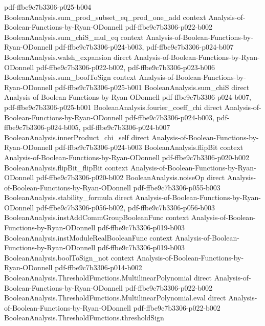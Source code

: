 \begin{lemma}
  {pdf-ffbe9c7b3306-p025-b004}
\proofstep
  {BooleanAnalysis.sum_prod_subset_eq_prod_one_add}
  {context}
  {Analysis-of-Boolean-Functions-by-Ryan-ODonnell}
  {pdf-ffbe9c7b3306-p022-b002}
\proofstep
  {BooleanAnalysis.sum_chiS_mul_eq}
  {context}
  {Analysis-of-Boolean-Functions-by-Ryan-ODonnell}
  {pdf-ffbe9c7b3306-p024-b003,
    pdf-ffbe9c7b3306-p024-b007}
\proofstep
  {BooleanAnalysis.walsh_expansion}
  {direct}
  {Analysis-of-Boolean-Functions-by-Ryan-ODonnell}
  {pdf-ffbe9c7b3306-p022-b002,
    pdf-ffbe9c7b3306-p023-b006}
\proofstep
  {BooleanAnalysis.sum_boolToSign}
  {context}
  {Analysis-of-Boolean-Functions-by-Ryan-ODonnell}
  {pdf-ffbe9c7b3306-p025-b001}
\proofstep
  {BooleanAnalysis.sum_chiS}
  {direct}
  {Analysis-of-Boolean-Functions-by-Ryan-ODonnell}
  {pdf-ffbe9c7b3306-p024-b007,
    pdf-ffbe9c7b3306-p025-b001}
\proofstep
  {BooleanAnalysis.fourier_coeff_chi}
  {direct}
  {Analysis-of-Boolean-Functions-by-Ryan-ODonnell}
  {pdf-ffbe9c7b3306-p024-b003,
    pdf-ffbe9c7b3306-p024-b005,
    pdf-ffbe9c7b3306-p024-b007}
\proofstep
  {BooleanAnalysis.innerProduct_chi_self}
  {direct}
  {Analysis-of-Boolean-Functions-by-Ryan-ODonnell}
  {pdf-ffbe9c7b3306-p024-b003}
\proofstep
  {BooleanAnalysis.flipBit}
  {context}
  {Analysis-of-Boolean-Functions-by-Ryan-ODonnell}
  {pdf-ffbe9c7b3306-p020-b002}
\proofstep
  {BooleanAnalysis.flipBit_flipBit}
  {context}
  {Analysis-of-Boolean-Functions-by-Ryan-ODonnell}
  {pdf-ffbe9c7b3306-p020-b002}
\proofstep
  {BooleanAnalysis.noiseOp}
  {direct}
  {Analysis-of-Boolean-Functions-by-Ryan-ODonnell}
  {pdf-ffbe9c7b3306-p055-b003}
\proofstep
  {BooleanAnalysis.stability_formula}
  {direct}
  {Analysis-of-Boolean-Functions-by-Ryan-ODonnell}
  {pdf-ffbe9c7b3306-p056-b002,
    pdf-ffbe9c7b3306-p056-b003}
\proofstep
  {BooleanAnalysis.instAddCommGroupBooleanFunc}
  {context}
  {Analysis-of-Boolean-Functions-by-Ryan-ODonnell}
  {pdf-ffbe9c7b3306-p019-b003}
\proofstep
  {BooleanAnalysis.instModuleRealBooleanFunc}
  {context}
  {Analysis-of-Boolean-Functions-by-Ryan-ODonnell}
  {pdf-ffbe9c7b3306-p019-b003}
\proofstep
  {BooleanAnalysis.boolToSign_not}
  {context}
  {Analysis-of-Boolean-Functions-by-Ryan-ODonnell}
  {pdf-ffbe9c7b3306-p014-b002}
\proofstep
  {BooleanAnalysis.ThresholdFunctions.MultilinearPolynomial}
  {direct}
  {Analysis-of-Boolean-Functions-by-Ryan-ODonnell}
  {pdf-ffbe9c7b3306-p022-b002}
\proofstep
  {BooleanAnalysis.ThresholdFunctions.MultilinearPolynomial.eval}
  {direct}
  {Analysis-of-Boolean-Functions-by-Ryan-ODonnell}
  {pdf-ffbe9c7b3306-p022-b002}
\proofstep
  {BooleanAnalysis.ThresholdFunctions.thresholdSign}

\end{lemma}
